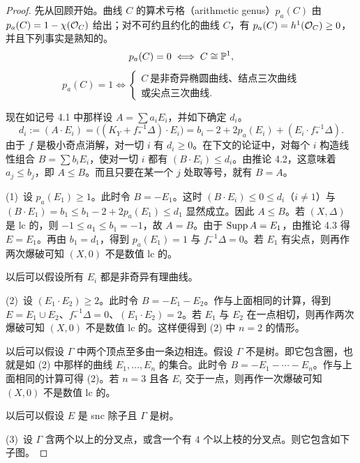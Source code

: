 \begin{proof}
先从回顾开始。曲线 $C$ 的算术亏格（arithmetic genus）$p_a(C)$ 由 $p_a(C)=1-\chi(\mathcal{O}_C)$ 给出；对不可约且约化的曲线 $C$，有 $p_a(C)=h^1(\mathcal{O}_C)\ge 0$，并且下列事实是熟知的。
\[
p_a(C)=0\iff C\cong\mathbb{P}^1,
\]
\[
p_a(C)=1\iff
\begin{cases}
C\ \text{是非奇异椭圆曲线、结点三次曲线}\\
\text{或尖点三次曲线}.
\end{cases}
\]

现在如记号 4.1 中那样设 $A=\sum a_iE_i$，并如下确定 $d_i$。
\[
d_i:=(A\cdot E_i)=\bigl((K_Y+f_*^{-1}\Delta)\cdot E_i\bigr)=b_i-2+2p_a(E_i)+(E_i\cdot f_*^{-1}\Delta).
\]
由于 $f$ 是极小奇点消解，对一切 $i$ 有 $d_i\ge 0$。在下文的论证中，对每个 $i$ 构造线性组合 $B=\sum b_iE_i$，使对一切 $i$ 都有 $(B\cdot E_i)\le d_i$。由推论 4.2，这意味着 $a_j\le b_j$，即 $A\le B$。而且只要在某一个 $j$ 处取等号，就有 $B=A$。

(1)\ 设 $p_a(E_1)\ge 1$。此时令 $B=-E_1$。这时 $(B\cdot E_i)\le 0\le d_i$（$i\ne 1$）与 $(B\cdot E_1)=b_1\le b_1-2+2p_a(E_1)\le d_1$ 显然成立。因此 $A\le B$。若 $(X,\Delta)$ 是 lc 的，则 $-1\le a_1\le b_1=-1$，故 $A=B$。由于 $\operatorname{Supp} A=E_1$，由推论 4.3 得 $E=E_1$。再由 $b_1=d_1$，得到 $p_a(E_1)=1$ 与 $f_*^{-1}\Delta=0$。若 $E_1$ 有尖点，则再作两次爆破可知 $(X,0)$ 不是数值 lc 的。


以后可以假设所有 $E_i$ 都是非奇异有理曲线。

(2)\ 设 $(E_1\cdot E_2)\ge 2$。此时令 $B=-E_1-E_2$。作与上面相同的计算，得到 $E=E_1\cup E_2$、$f_*^{-1}\Delta=0$、$(E_1\cdot E_2)=2$。若 $E_1$ 与 $E_2$ 在一点相切，则再作两次爆破可知 $(X,0)$ 不是数值 lc 的。这样便得到 (2) 中 $n=2$ 的情形。

以后可以假设 $\Gamma$ 中两个顶点至多由一条边相连。假设 $\Gamma$
不是树。即它包含圈，也就是如 (2) 中那样的曲线 $E_1,\dots,E_n$ 的集合。此时令 $B=-E_1-\cdots-E_n$。作与上面相同的计算可得 (2)。若 $n=3$ 且各 $E_i$ 交于一点，则再作一次爆破可知 $(X,0)$ 不是数值 lc 的。

以后可以假设 $E$ 是 snc 除子且 $\Gamma$ 是树。

(3)\ 设 $\Gamma$ 含两个以上的分叉点，或含一个有 $4$ 个以上枝的分叉点。则它包含如下子图。


\end{proof}
